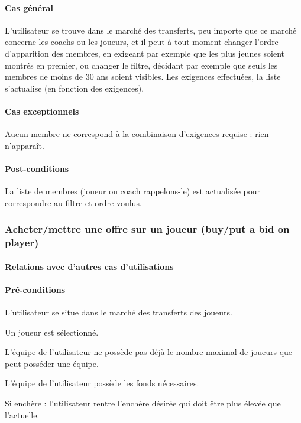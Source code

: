 \paragraph{Cas général}
L'utilisateur se trouve dans le marché des transferts, peu importe que ce marché concerne les coachs ou les joueurs, et il peut à tout moment changer l'ordre d'apparition des membres, en exigeant par exemple que les plus jeunes soient montrés en premier, ou changer le filtre, décidant par exemple que seuls les membres de moins de 30 ans soient visibles. Les exigences effectuées, la liste s'actualise (en fonction des exigences). 
\paragraph{Cas exceptionnels}
Aucun membre ne correspond à la combinaison d'exigences requise : rien n'apparaît. 
\paragraph{Post-conditions}
\begin{list}{}{\leftmargin=1.5em}
\item{La liste de membres (joueur ou coach rappelons-le) est actualisée pour correspondre au filtre et ordre voulus.}
\end{list}

\subsubsection{Acheter/mettre une offre sur un joueur (buy/put a bid on player)}
\label{UC:buyPlayer}
\paragraph{Relations avec d'autres cas d'utilisations}
\paragraph{Pré-conditions}
\begin{list}{}{\leftmargin=1.5em}
\item{L'utilisateur se situe dans le marché des transferts des joueurs.}
\item{Un joueur est sélectionné.}
\item{L'équipe de l'utilisateur ne possède pas déjà le nombre maximal de joueurs que peut posséder une équipe.}
\item{L'équipe de l'utilisateur possède les fonds nécessaires.}
\item{Si enchère : l'utilisateur rentre l'enchère désirée qui doit être plus élevée que l'actuelle.}
\end{list}
